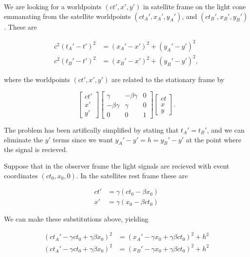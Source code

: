 We are looking for a worldpoints $(ct', x', y')$ in satellite frame on the light cone emmanating from the satellite worldpoints $(ct_A', x_A', y_A')$, and $(ct_B', x_B', y_B')$.  These are

\begin{align}\label{eqn:relElectroDynProblemSet2:1200}
c^2 ( t_A' - t')^2 &= (x_A' - x')^2 + (y_A' - y')^2 \\
c^2 ( t_B' - t')^2 &= (x_B' - x')^2 + (y_B' - y')^2,
\end{align}

where the worldpoints $(ct', x', y')$ are related to the stationary frame by

\begin{equation}\label{eqn:relElectroDynProblemSet2:1220}
\begin{bmatrix}
ct' \\
x' \\
y'
\end{bmatrix}
\begin{bmatrix}
\gamma & -\beta \gamma & 0 \\
-\beta \gamma & \gamma & 0 \\
0 & 0 & 1
\end{bmatrix}
\begin{bmatrix}
ct \\
x \\
y
\end{bmatrix}.
\end{equation}

The problem has been artifically simplified by stating that $t_A' = t_B'$, and we can eliminate the $y'$ terms since we want $y_A' - y' = h = y_B' - y'$ at the point where the signal is recieved.

Suppose that in the observer frame the light signals are recieved with event coordinates $(c t_0, x_0, 0)$.  In the satellites rest frame these are

\begin{align}\label{eqn:relElectroDynProblemSet2:1240}
ct' &= \gamma ( c t_0 - \beta x_0 ) \\
x' &= \gamma ( x_0 - \beta c t_0 )
\end{align}

We can make these substitutions above, yielding

\begin{align}\label{eqn:relElectroDynProblemSet2:1260}
( c t_A' - \gamma c t_0 + \gamma \beta x_0)^2 &= (x_A' - \gamma x_0 + \gamma \beta c t_0 )^2 + h^2 \\
( c t_A' - \gamma c t_0 + \gamma \beta x_0)^2 &= (x_B' - \gamma x_0 + \gamma \beta c t_0 )^2 + h^2
\end{align}

